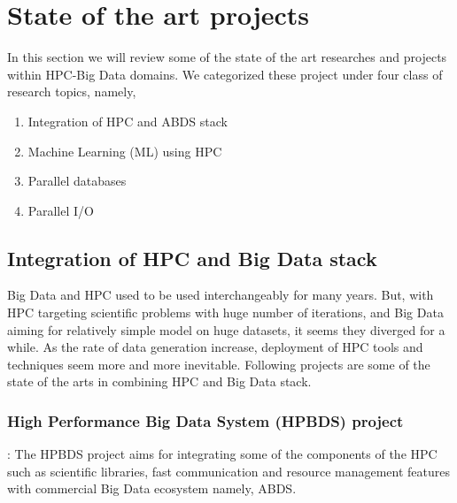 \documentclass[runningheads,a4paper]{llncs}
\begin{document}
\section{State of the art projects}
In this section we will review some of the state of the art researches and projects within HPC-Big Data domains. We categorized these project under four class of research topics, namely,
\begin{enumerate}
	\item Integration of HPC and ABDS stack
	\item Machine Learning (ML) using HPC
	\item Parallel databases
	\item Parallel I/O
	
\end{enumerate}
\subsection{Integration of HPC and Big Data stack}
Big Data and HPC used to be used interchangeably for many years. But, with HPC targeting scientific problems with huge number of iterations, and Big Data aiming for relatively simple model on huge datasets, it seems they diverged for a while. As the rate of data generation increase, deployment of HPC tools and techniques seem more and more inevitable. Following projects are some of the state of the arts in combining HPC and Big Data stack.

\subsubsection{High Performance Big Data System (HPBDS) project \cite{qiu2014towards}}: The HPBDS project aims for integrating some of the components of the HPC such as scientific libraries, fast communication and resource management features with commercial Big Data ecosystem namely, ABDS.\\
\end{document}
